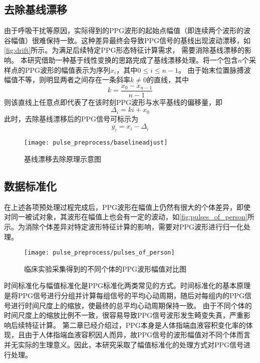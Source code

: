 \subsection{去除基线漂移}
由于呼吸干扰等原因，实际得到的PPG波形的起始点幅值（即连续两个波形的波谷幅值）很难保持一致。这种差异最终会导致PPG信号的基线出现波动漂移，如\autoref{fig:drift}所示。为满足后续特定PPG形态特征计算需求，
需要消除基线漂移的影响。
本研究借助一种基于线性变换的思路完成了基线漂移处理。将一个包含$n$个采样点的PPG波形的幅值表示为序列$x_i$，其中$0 \le i \le n-1$。
由于始末位置脉搏波幅值不等，则明显两者之间存在一条斜率$k \ne 0$的直线，其中
\begin{equation}
    \label{equ:linek}
    k=\frac{x_0-x_{n-1}}{n-1}
\end{equation}
则该直线上任意点即代表了在该时刻PPG波形与水平基线的偏移量，即
\begin{equation}
    \label{equ:liney}
    \Delta_i=ki+x_0
\end{equation}
此时，去除基线漂移后的PPG信号可标示为
\begin{equation}
    \label{equ:adjusta}
    y_i=x_i-\Delta_i
\end{equation}

\begin{figure}[htbp]
    \centering
    \texttt{[image: pulse\_preprocess/baselineadjust]}
    \caption{\label{fig:drift}基线漂移去除原理示意图}
\end{figure}

\subsection{数据标准化}
在上述各项预处理过程完成后，PPG波形在幅值上仍然有很大的个体差异，即使对同一被试对象，其波形在幅值上也会有一定的波动，如\autoref{fig:pulses_of_person}所示。为消除个体差异对特定波形特征计算的影响，需要对PPG波形进行归一化处理。
\begin{figure}[htbp]
    \centering
    \texttt{[image: pulse\_preprocess/pulses\_of\_person]}
    \caption{\label{fig:pulses_of_person}临床实验采集得到的不同个体的PPG波形幅值对比图}
\end{figure}

时间标准化与幅值标准化是PPG标准化两类常见的方式\cite{mmt}。时间标准化的基本原理是将PPG信号进行分组并计算每组信号的平均心动周期，随后对每组内的PPG信号进行时间尺度上的缩放，使最终的总平均心动周期保持一致。
由于不同个体的时间尺度上的缩放比例不一致，很容易导致PPG信号波形发生畸变失真，严重影响后续特征计算。
第二章已经介绍过，PPG本身是人体指端血液容积变化率的体现，且由于人体指端血液容积因人而异，故PPG信号的波形幅值对不同个体而言并无实际的生理意义。因此，本研究采取了幅值标准化的处理方式对PPG信号进行处理。

